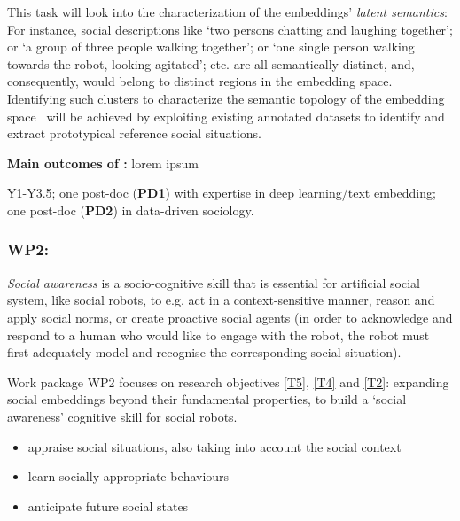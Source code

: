 This task will look into the characterization of the embeddings' \emph{latent
semantics}: For instance, social descriptions like `two persons chatting and
laughing together'; or `a group of three people walking together'; or `one
single person walking towards the robot, looking agitated'; etc.  are all
semantically distinct, and, consequently, would belong to distinct regions in
the embedding space. Identifying such clusters to characterize the semantic
topology of the embedding space~\cite{sun2023topological} will be achieved by
exploiting existing annotated datasets to identify and extract prototypical
reference social situations.

\begin{framed}
    {\noindent\bf Main outcomes of \tAD:} lorem ipsum 
\end{framed}


\begin{framed}
     Y1-Y3.5; one post-doc ({\bf PD1}) with expertise in
    deep learning/text embedding; one post-doc ({\bf PD2}) in data-driven
    sociology.
\end{framed}

\subsubsection{WP2: \textbf{\WPB}}

\emph{Social awareness} is a socio-cognitive skill that is essential for
artificial social system, like social robots, to e.g.  act in a
context-sensitive manner, reason and apply social norms, or create proactive
social agents (in order to acknowledge and respond to a human who would like
to engage with the robot, the robot must first adequately model and
recognise the corresponding social situation).

Work package WP2 focuses on research objectives \ref{T5}, \ref{T4} and \ref{T2}:
expanding social embeddings beyond their fundamental properties, to build a
`social awareness' cognitive skill for social robots.

\begin{itemize}
    \item appraise social situations, also taking into account the social context
    \item learn socially-appropriate behaviours
    \item anticipate future social states
\end{itemize}



